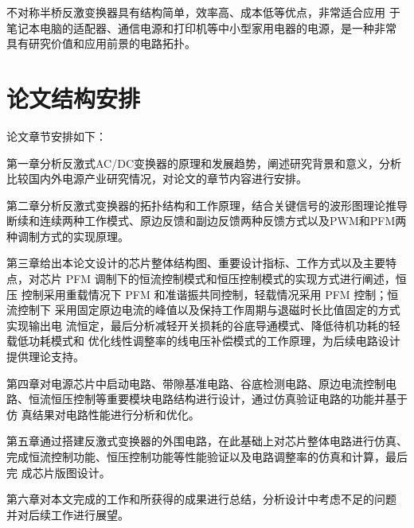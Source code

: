 不对称半桥反激变换器具有结构简单，效率高、成本低等优点，非常适合应用 于笔记本电脑的适配器、通信电源和打印机等中小型家用电器的电源，是一种非常 具有研究价值和应用前景的电路拓扑。

\section{论文结构安排}


论文章节安排如下： 

第一章分析反激式AC/DC变换器的原理和发展趋势，阐述研究背景和意义，分析比较国内外电源产业研究情况，对论文的章节内容进行安排。 

第二章分析反激式变换器的拓扑结构和工作原理，结合关键信号的波形图理论推导断续和连续两种工作模式、原边反馈和副边反馈两种反馈方式以及PWM和PFM两种调制方式的实现原理。 

第三章给出本论文设计的芯片整体结构图、重要设计指标、工作方式以及主要特 点，对芯片 PFM 调制下的恒流控制模式和恒压控制模式的实现方式进行阐述，恒压 控制采用重载情况下 PFM 和准谐振共同控制，轻载情况采用 PFM 控制；恒流控制下 采用固定原边电流的峰值以及保持工作周期与退磁时长比值固定的方式实现输出电 流恒定，最后分析减轻开关损耗的谷底导通模式、降低待机功耗的轻载低功耗模式和 优化线性调整率的线电压补偿模式的工作原理，为后续电路设计提供理论支持。 

第四章对电源芯片中启动电路、带隙基准电路、谷底检测电路、原边电流控制电 路、恒流恒压控制等重要模块电路结构进行设计，通过仿真验证电路的功能并基于仿 真结果对电路性能进行分析和优化。 

第五章通过搭建反激式变换器的外围电路，在此基础上对芯片整体电路进行仿真、 完成恒流控制功能、恒压控制功能等性能验证以及电路调整率的仿真和计算，最后完 成芯片版图设计。 

第六章对本文完成的工作和所获得的成果进行总结，分析设计中考虑不足的问题 并对后续工作进行展望。














